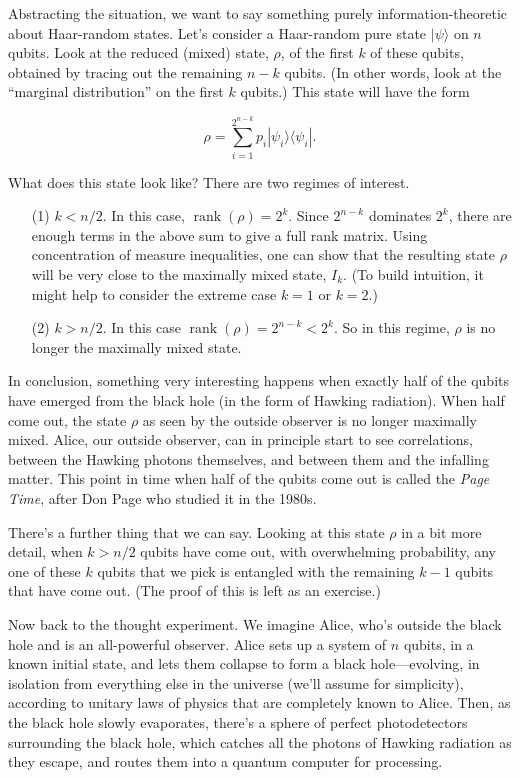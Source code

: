 \documentclass[12pt]{report}
\theoremstyle{plain}
\theoremstyle{definition}
\renewcommand{\ket}[1]{|#1\rangle}
\newcommand{\ketbra}[2]{|#1\rangle\!\langle#2|}
\begin{document}
Abstracting the situation, we want to say something
purely information-theoretic about Haar-random states.
Let's consider a Haar-random pure state $\ket{\psi}$ on $n$ qubits.
Look at the reduced (mixed) state, ${\rho}$, of the first $k$ of these qubits,
obtained by tracing out the remaining $n-k$ qubits.
(In other words, look at the ``marginal distribution'' on the
first $k$ qubits.)  This state will have the form

$$\rho = \sum_{i=1}^{2^{n-k}} p_i \ketbra{\psi_i}{\psi_i}.$$

What does this state look like?  There are two regimes of interest.

\begin{itemize}
\item[(1)] $k<n/2$. In this case, $\operatorname*{rank}(\rho) = 2^k$.
Since $2^{n-k}$ dominates $2^k$, there are enough terms in
the above sum to give a full rank matrix. Using
concentration of measure inequalities, one can show that
the resulting state $\rho$ will be
very close to the maximally mixed state, $I_k$.  (To build intuition, it might help
to consider the extreme case $k=1$ or $k=2$.)
\item[(2)] $k > n/2$.
In this case $\operatorname*{rank}(\rho) = 2^{n-k} < 2^k$.  So in this regime,
$\rho$ is
no longer the maximally mixed state.
\end{itemize}

In conclusion, something very interesting happens when exactly half of the
qubits have emerged from the black hole (in the form of
Hawking radiation).
When half come out, the state $\rho$ as seen by the
outside observer is no longer maximally mixed.
Alice, our outside observer, can in principle start to see correlations, between the Hawking photons themselves, and between them and the infalling matter.
This point in time when half of the qubits come out is
called the {\em Page Time}, after Don Page who studied
it in the 1980s.

There's a further thing that we can say.
Looking at this state $\rho$ in a bit more detail,
when $k>n/2$ qubits have come out, with overwhelming probability, any one of these $k$ qubits
that we pick is entangled with the remaining $k-1$ qubits that
have come out.  (The proof of this is left as an exercise.)

Now back to the thought experiment.
We imagine Alice, who's outside the black hole and is
an all-powerful observer.  Alice sets up a system of $n$ qubits,
in a known initial state, and lets them collapse to form a black hole---evolving,
in isolation from everything else in the universe (we'll assume for simplicity), according
to unitary laws of physics that are completely known to Alice.
Then, as the black hole slowly evaporates, there's a sphere of perfect photodetectors surrounding
the black hole, which catches all the photons of Hawking radiation as they escape,
and routes them into a quantum computer for
processing.
\end{document}
